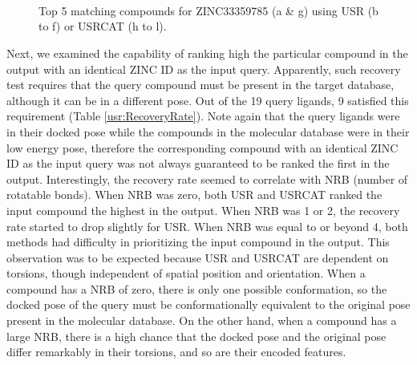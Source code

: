 \begin{figure}
\centering
{}
\\
\\
\\
\caption{Top 5 matching compounds for ZINC33359785 (a \& g) using USR (b to f) or USRCAT (h to l).}
\label{usr:ZINC33359785}
\end{figure}

Next, we examined the capability of ranking high the particular compound in the output with an identical ZINC ID as the input query. Apparently, such recovery test requires that the query compound must be present in the target database, although it can be in a different pose. Out of the 19 query ligands, 9 satisfied this requirement (Table \ref{usr:RecoveryRate}). Note again that the query ligands were in their docked pose while the compounds in the molecular database were in their low energy pose, therefore the corresponding compound with an identical ZINC ID as the input query was not always guaranteed to be ranked the first in the output. Interestingly, the recovery rate seemed to correlate with NRB (number of rotatable bonds). When NRB was zero, both USR and USRCAT ranked the input compound the highest in the output. When NRB was 1 or 2, the recovery rate started to drop slightly for USR. When NRB was equal to or beyond 4, both methods had difficulty in prioritizing the input compound in the output. This observation was to be expected because USR and USRCAT are dependent on torsions, though independent of spatial position and orientation. When a compound has a NRB of zero, there is only one possible conformation, so the docked pose of the query must be conformationally equivalent to the original pose present in the molecular database. On the other hand, when a compound has a large NRB, there is a high chance that the docked pose and the original pose differ remarkably in their torsions, and so are their encoded features.

